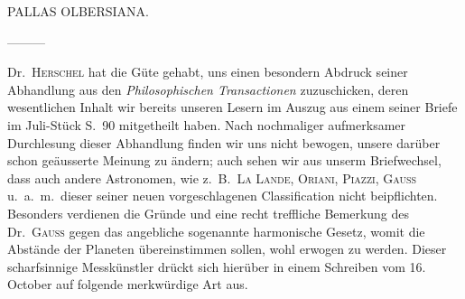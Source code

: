\bigskip{}
\begin{center}
PALLAS OLBERSIANA.
\end{center}
\noindent\hspace*{\parindent}—\quad —\quad —\par\nobreak
\indent Dr.\ \textsc{Herschel} hat die Güte gehabt, uns einen besondern Abdruck seiner Abhandlung aus den \textit{Philosophischen Transactionen} zuzuschicken, deren wesentlichen Inhalt wir bereits unseren Lesern im Auszug aus einem seiner Briefe im Juli-Stück S.\ 90 mitgetheilt haben. Nach nochmaliger aufmerksamer Durchlesung dieser Abhandlung finden wir uns nicht bewogen, unsere darüber schon geäusserte Meinung zu ändern; auch sehen wir aus unserm Briefwechsel, dass auch andere Astronomen, wie z.\ B.\ \textsc{La Lande}, \textsc{Oriani}, \textsc{Piazzi}, \textsc{Gauss} u.\ a.\ m.\ dieser seiner neuen vorgeschlagenen Classification nicht beipflichten. Besonders verdienen die Gründe und eine recht treffliche Bemerkung des Dr.\ \textsc{Gauss} gegen das angebliche sogenannte harmonische Gesetz, womit die Abstände der Planeten übereinstimmen sollen, wohl erwogen zu werden. Dieser scharfsinnige Messkünstler drückt sich hierüber in einem Schreiben vom 16. October auf folgende merkwürdige Art aus.

